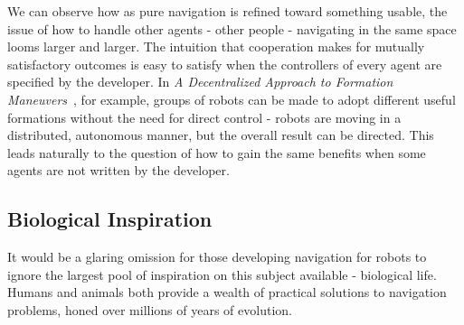 \documentclass{sfuthesis}
\begin{document}
We can observe how as pure navigation is refined toward something usable, the issue of how to handle other agents - other people - navigating in the same space looms larger and larger. The intuition that cooperation makes for mutually satisfactory outcomes is easy to satisfy when the controllers of every agent are specified by the developer. In \textit{A Decentralized Approach to Formation Maneuvers}~\cite{lawton2003decentralized}, for example, groups of robots can be made to adopt different useful formations without the need for direct control - robots are moving in a distributed, autonomous manner, but the overall result can be directed. This leads naturally to the question of how to gain the same benefits when some agents are not written by the developer.














\subsection{Biological Inspiration}

It would be a glaring omission for those developing navigation for robots to ignore the largest pool of inspiration on this subject available - biological life. Humans and animals both provide a wealth of practical solutions to navigation problems, honed over millions of years of evolution.
\end{document}
